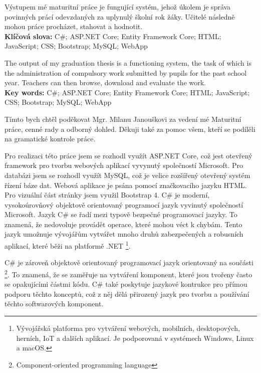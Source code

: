 \documentclass[a4paper, 12pt]{report}
\begin{document}
	\titulniStrana
	
	\anotace Výstupem mé maturitní práce je fungující systém, jehož úkolem je správa povinných prácí odevzdaných za uplynulý školní rok žáky. Učitelé následně mohou práce procházet, stahovat a hodnotit.\\
	\textbf{Klíčová slova: }	C\#; ASP.NET Core; Entity Framework Core; HTML; JavaScript; CSS; Bootstrap; MySQL; WebApp

	\annotation The output of my graduation thesis is a functioning system, the task of which is the administration of compulsory work submitted by pupils for the past school year. Teachers can then browse, download and evaluate the work.\\
	\textbf{Key words: } C\#; ASP.NET Core; Entity Framework Core; HTML; JavaScript; CSS; Bootstrap; MySQL; WebApp

	\podekovani Tímto bych chtěl poděkovat Mgr. Milanu Janouškovi za vedení mé Maturitní práce, cenné rady a odborný dohled. Děkuji také za pomoc všem, kteří se podílěli na gramatické kontrole práce.
	
	\obsah
	
		Pro realizaci této práce jsem se rozhodl využít ASP.NET Core, což jest otevřený framework pro tvorbu webových aplikací vyvynutý společností Microsoft. Pro 	 databázi jsem se rozhodl využít MySQL, což je velice rozšířený otevřený systém řízení báze dat. Webová aplikace je psána pomocí značkovacího jazyku HTML. Pro vizuální část stránky jsem využil Bootstrap 4.
			C\# je moderní, vysokoúrovňový objektově orientovaný programocí jazyk vyvinutý společností Microsoft. Jazyk C\# se řadí mezi typově bezpečné programovací jazyky. To znamená, že nedovoluje provádět operace, které mohou véct k chybám. Tento jazyk umožnuje vývojářům vytvářet mnoho druhů zabezpečených a robusních aplikací, které běži na platformě .NET \footnote{Vývojářská platforma pro vytváření webových, mobilních, desktopových, herních, IoT a dalších aplikací. Je podporovaná v systémech Windows, Linux a macOS.}.\par
			C\# je zároveň objektově orientovaný programovací jazyk orientovaný na součásti \footnote{Component-oriented programming language}. To znamená, že se zaměřuje na vytváření komponent, které jsou tvořeny často se opakujícími částmi kódu. C\# také poskytuje jazykové kontrukce pro přímou podporu těchto konceptů, což z něj dělá přirozený jazyk pro tvorbu a používání těchto softwarových komponent.\cite{CSharp}
\end{document}
